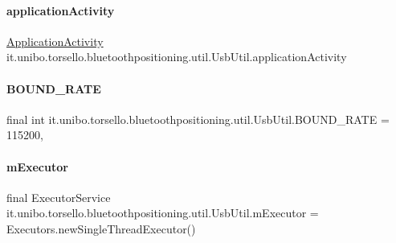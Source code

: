 \paragraph{\texorpdfstring{application\+Activity}{applicationActivity}}
{\footnotesize\ttfamily \hyperlink{classit_1_1unibo_1_1torsello_1_1bluetoothpositioning_1_1activities_1_1ApplicationActivity}{Application\+Activity} it.\+unibo.\+torsello.\+bluetoothpositioning.\+util.\+Usb\+Util.\+application\+Activity\hspace{0.3cm}{\ttfamily [private]}}

\hypertarget{classit_1_1unibo_1_1torsello_1_1bluetoothpositioning_1_1util_1_1UsbUtil_aec0f258e676be1d17b57b0df94aeeb79_aec0f258e676be1d17b57b0df94aeeb79}{}\label{classit_1_1unibo_1_1torsello_1_1bluetoothpositioning_1_1util_1_1UsbUtil_aec0f258e676be1d17b57b0df94aeeb79_aec0f258e676be1d17b57b0df94aeeb79} 
\paragraph{\texorpdfstring{B\+O\+U\+N\+D\+\_\+\+R\+A\+TE}{BOUND\_RATE}}
{\footnotesize\ttfamily final int it.\+unibo.\+torsello.\+bluetoothpositioning.\+util.\+Usb\+Util.\+B\+O\+U\+N\+D\+\_\+\+R\+A\+TE = 115200\hspace{0.3cm}{\ttfamily [static]}, {\ttfamily [private]}}

\hypertarget{classit_1_1unibo_1_1torsello_1_1bluetoothpositioning_1_1util_1_1UsbUtil_a0b5ea6576e2234b8f7a43343b598d637_a0b5ea6576e2234b8f7a43343b598d637}{}\label{classit_1_1unibo_1_1torsello_1_1bluetoothpositioning_1_1util_1_1UsbUtil_a0b5ea6576e2234b8f7a43343b598d637_a0b5ea6576e2234b8f7a43343b598d637} 
\paragraph{\texorpdfstring{m\+Executor}{mExecutor}}
{\footnotesize\ttfamily final Executor\+Service it.\+unibo.\+torsello.\+bluetoothpositioning.\+util.\+Usb\+Util.\+m\+Executor = Executors.\+new\+Single\+Thread\+Executor()\hspace{0.3cm}{\ttfamily [private]}}

